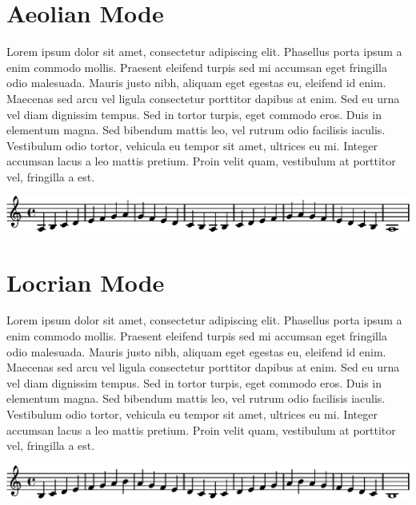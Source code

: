 \documentclass[11pt]{article}
\begin{document}
\section*{Aeolian Mode}
\label{sec-6}

Lorem ipsum dolor sit amet, consectetur adipiscing elit. Phasellus porta ipsum a enim commodo mollis. Praesent eleifend turpis sed mi accumsan eget fringilla odio malesuada. Mauris justo nibh, aliquam eget egestas eu, eleifend id enim. Maecenas sed arcu vel ligula consectetur porttitor dapibus at enim. Sed eu urna vel diam dignissim tempus. Sed in tortor turpis, eget commodo eros. Duis in elementum magna. Sed bibendum mattis leo, vel rutrum odio facilisis iaculis. Vestibulum odio tortor, vehicula eu tempor sit amet, ultrices eu mi. Integer accumsan lacus a leo mattis pretium. Proin velit quam, vestibulum at porttitor vel, fringilla a est.
\linebreak


\includegraphics[width=17cm]{aeolian.eps}
\section*{Locrian Mode}
\label{sec-7}

Lorem ipsum dolor sit amet, consectetur adipiscing elit. Phasellus porta ipsum a enim commodo mollis. Praesent eleifend turpis sed mi accumsan eget fringilla odio malesuada. Mauris justo nibh, aliquam eget egestas eu, eleifend id enim. Maecenas sed arcu vel ligula consectetur porttitor dapibus at enim. Sed eu urna vel diam dignissim tempus. Sed in tortor turpis, eget commodo eros. Duis in elementum magna. Sed bibendum mattis leo, vel rutrum odio facilisis iaculis. Vestibulum odio tortor, vehicula eu tempor sit amet, ultrices eu mi. Integer accumsan lacus a leo mattis pretium. Proin velit quam, vestibulum at porttitor vel, fringilla a est.
\linebreak


\includegraphics[width=17cm]{locrian.eps}
\end{document}
